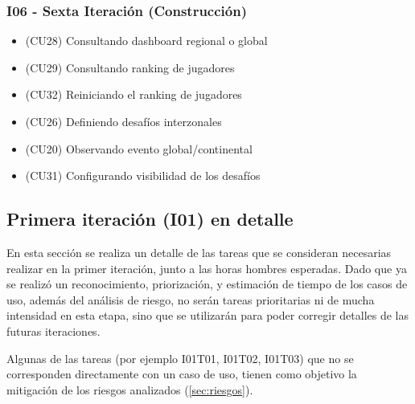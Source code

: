 \subsubsection{I06 - Sexta Iteración (Construcción)}
\begin{itemize}
\item (CU28) Consultando dashboard regional o global
\item (CU29) Consultando ranking de jugadores
\item (CU32) Reiniciando el ranking de jugadores
\item (CU26) Definiendo desafíos interzonales
\item (CU20) Observando evento global/continental
\item (CU31) Configurando visibilidad de los desafíos
\end{itemize}


\subsection{Primera iteración (I01) en detalle}
\label{subsec:primeraiteracion}
En esta sección se realiza un detalle de las tareas que se consideran necesarias realizar en la primer iteración, junto a las horas hombres esperadas. Dado que ya se realizó un reconocimiento, priorización, y estimación de tiempo de los casos de uso, además del análisis de riesgo, no serán tareas prioritarias ni de mucha intensidad en esta etapa, sino que se utilizarán para poder corregir detalles de las futuras iteraciones.

Algunas de las tareas (por ejemplo I01T01, I01T02, I01T03) que no se corresponden directamente con un caso de uso, tienen como objetivo la mitigación de los riesgos analizados (\ref{sec:riesgos}).

